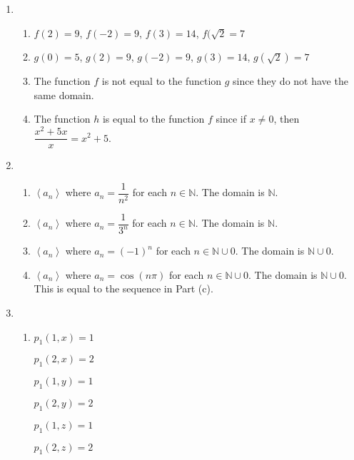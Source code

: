 \begin{enumerate}
\item \begin{enumerate}
\item $f(2) = 9$, $f(-2) = 9$, $f(3) = 14$, $f(\sqrt{2} = 7$

\item $g(0) = 5$, $g(2) = 9$, $g(-2) = 9$, $g(3) = 14$, $g(\sqrt{2}) = 7$

\item The function $f$ is not equal to the function $g$ since they do not have the same domain.

\item The function $h$ is equal to the function $f$ since if $x \ne 0$, then 
$\dfrac{x^2 + 5x}{x} = x^2 + 5$.

\end{enumerate}

\item \begin{enumerate}
\item $\left\langle {a_n } \right\rangle $  where  $a_n  = \dfrac{1}{{n^2 }}$  for each  
$n \in \mathbb{N}$.  The domain is  $\mathbb{N}$.

\item $\left\langle {a_n } \right\rangle $  where  $a_n  = \dfrac{1}{{3^n }}$  for each  
$n \in \mathbb{N}$.  The domain is  $\mathbb{N}$.

\item $\left\langle {a_n } \right\rangle $  where  $a_n  = ( -1 )^{n}$  for each  $n \in \mathbb{N} \cup {0}$.  The domain is  $\mathbb{N} \cup {0}$.

\item $\left\langle {a_n } \right\rangle $  where  $a_n  = \cos ( {n\pi } )$  for each  $n \in \mathbb{N} \cup {0}$.  The domain is  $\mathbb{N} \cup {0}$.  This is equal to the sequence in Part (c).
\end{enumerate}



\item \begin{enumerate}
\item
\begin{multicols}{3}
$p_1 ( 1, x ) = 1$

$p_1 ( 2, x ) = 2$

$p_1 ( 1, y ) = 1$

$p_1 ( 2, y ) = 2$

$p_1 ( 1, z ) = 1$

$p_1 ( 2, z ) = 2$
\end{multicols}


\end{enumerate}
\end{enumerate}
